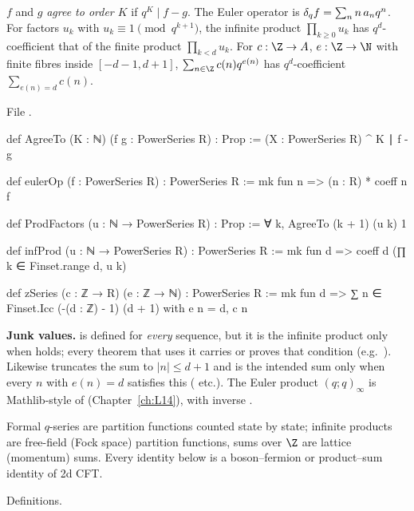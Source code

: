 \begin{definition}\label{l25:def:toolkit}
$f$ and $g$ \emph{agree to order $K$} if $q^K\mid f-g$. The Euler operator is $\delta_q f=\sum_nn\,a_nq^n$. For factors
$u_k$ with $u_k\equiv1\pmod{q^{k+1}}$, the infinite product $\prod_{k\ge0}u_k$ has $q^d$-coefficient that of the
finite product $\prod_{k<d}u_k$. For $c:\Z\to A$, $e:\Z\to\N$ with finite fibres inside $[-d-1,d+1]$,
$\sum_{n\in\Z}c(n)q^{e(n)}$ has $q^d$-coefficient $\sum_{e(n)=d}c(n)$.
\end{definition}
\noindent File .
\begin{leancode}
def AgreeTo (K : ℕ) (f g : PowerSeries R) : Prop := (X : PowerSeries R) ^ K ∣ f - g

def eulerOp (f : PowerSeries R) : PowerSeries R := mk fun n => (n : R) * coeff n f

def ProdFactors (u : ℕ → PowerSeries R) : Prop := ∀ k, AgreeTo (k + 1) (u k) 1

def infProd (u : ℕ → PowerSeries R) : PowerSeries R :=
  mk fun d => coeff d (∏ k ∈ Finset.range d, u k)

def zSeries (c : ℤ → R) (e : ℤ → ℕ) : PowerSeries R :=
  mk fun d => ∑ n ∈ Finset.Icc (-(d : ℤ) - 1) (d + 1) with e n = d, c n
\end{leancode}
\begin{dictionary}
\textbf{Junk values.}  is defined for \emph{every} sequence, but it is the infinite product only
when  holds; every theorem that uses it carries or proves that condition
(e.g.\ ). Likewise  truncates the sum to $|n|\le d+1$ and is
the intended sum only when every $n$ with $e(n)=d$ satisfies this ( etc.). The Euler
product $(q;q)_\infty$ is Mathlib-style  of  (Chapter~\ref{ch:L14}), with
inverse .
\end{dictionary}
\begin{physics}
Formal $q$-series are partition functions counted state by state; infinite products are free-field (Fock space)
partition functions, sums over $\Z$ are lattice (momentum) sums. Every identity below is a boson--fermion or
product--sum identity of 2d CFT.
\end{physics}
\begin{status}
Definitions.
\end{status}

